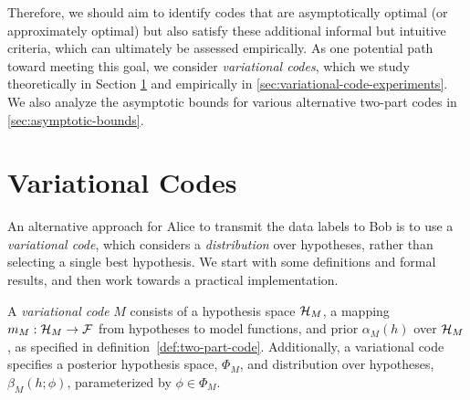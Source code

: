 Therefore, we should aim to identify codes that are asymptotically optimal (or approximately optimal) but also satisfy these additional informal but intuitive criteria, which can ultimately be assessed empirically.
As one potential path toward meeting this goal, we consider \emph{variational codes}, which we study theoretically in Section \ref{sec:variational-codes} and empirically in \ref{sec:variational-code-experiments}. We also analyze the asymptotic bounds for various alternative two-part codes in \ref{sec:asymptotic-bounds}. %

\vspace{-0.12cm}
\section{Variational Codes}
\label{sec:variational-codes}
\vspace{-0.1cm}



An alternative approach for Alice to transmit the data labels to Bob is to use a \emph{variational code}, which considers a \emph{distribution} over hypotheses, rather than selecting a single best hypothesis. We start with some definitions and formal results, and then work towards a practical implementation.

\begin{defn}
A \emph{variational code} $M$ consists of a hypothesis space ${\mathcal{H}}_M$, a mapping $m_M : {\mathcal{H}}_M \rightarrow {\mathcal{F}}$ from hypotheses to model functions, and prior $\alpha_M(h)$ over ${\mathcal{H}}_M$, as specified in definition~\ref{def:two-part-code}. Additionally, a variational code specifies a posterior hypothesis space, $\Phi_M$, and distribution over hypotheses, $\beta_M(h;\phi)$, parameterized by $\phi \in \Phi_M$.
\end{defn}

